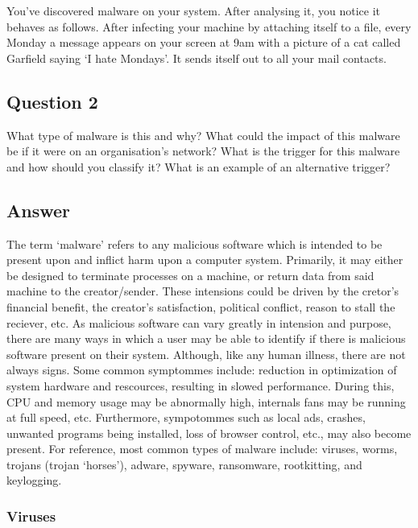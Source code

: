\documentclass[11pt, english]{article}
\begin{document}
	You've discovered malware on your system. After analysing it, you notice it behaves as follows. After infecting your machine by attaching itself to a file, every Monday a message appears on your screen at 9am with a picture of a cat called Garfield saying `I hate Mondays'. It sends itself out to all your mail contacts.

	\subsection{Question 2}

	What type of malware is this and why? What could the impact of this malware be if it were on an organisation's network? What is the trigger for this malware and how should you classify it? What is an example of an alternative trigger?

	\subsection{Answer}

	The term `malware' refers to any malicious software which is intended to be present upon and inflict harm upon a computer system. Primarily, it may either be designed to terminate processes on a machine, or return data from said machine to the creator/sender. These intensions could be driven by the cretor's financial benefit, the creator's satisfaction, political conflict, reason to stall the reciever, etc. As malicious software can vary greatly in intension and purpose, there are many ways in which a user may be able to identify if there is malicious software present on their system. Although, like any human illness, there are not always signs. Some common symptommes include: reduction in optimization of system hardware and rescources, resulting in slowed performance. During this, CPU and memory usage may be abnormally high, internals fans may be running at full speed, etc. Furthermore, sympotommes such as local ads, crashes, unwanted programs being installed, loss of browser control, etc., may also become present. For reference, most common types of malware include: viruses, worms, trojans (trojan `horses'), adware, spyware, ransomware, rootkitting, and keylogging. 

		\subsubsection{Viruses}
\end{document}
